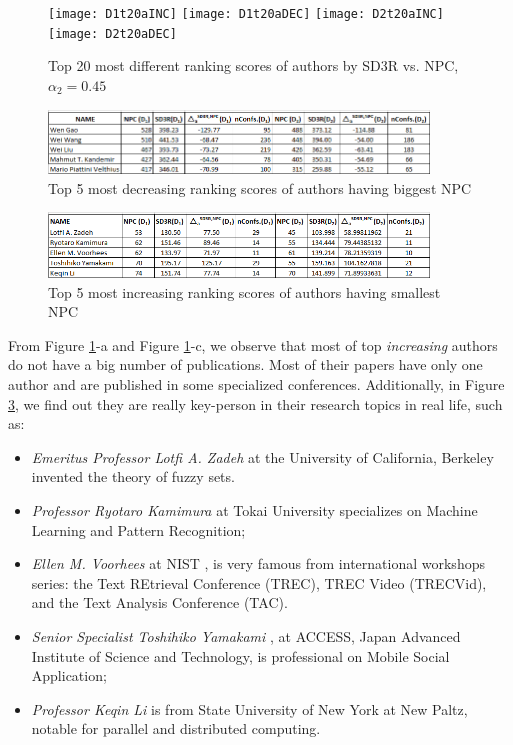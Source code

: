 \documentclass[10pt,leqno,twoside]{article}
\begin{document}
\begin{figure} 
	\caption{Top 20 most different ranking scores of authors by SD3R vs. NPC, $\alpha_2=0.45$}
	\label{Fig:Top20AuthorIncDec}
    \centering
    \texttt{[image: D1t20aINC]}
    \texttt{[image: D1t20aDEC]}
    \texttt{[image: D2t20aINC]}
    \texttt{[image: D2t20aDEC]}
\end{figure}
%
%
\begin{figure} %
	\caption{Top 5 most decreasing ranking scores of authors having biggest NPC}
	\label{Fig:Top5AuthorDec}
    \centering
    \includegraphics[width=0.9\textwidth]{T5adec}
\end{figure}
%
%
\begin{figure} %
	\caption{Top 5 most increasing ranking scores of authors having smallest NPC}
	\label{Fig:Top5AuthorInc}
    \centering
    \includegraphics[width=0.9\textwidth]{T5ainc}
\end{figure}
%
From Figure \ref{Fig:Top20AuthorIncDec}-a and Figure \ref{Fig:Top20AuthorIncDec}-c, we observe that most of top \textit{increasing} authors do not have a big number of publications. Most of their papers have only one author and are published in some specialized conferences. Additionally, in Figure \ref{Fig:Top5AuthorInc}, we find out they are really key-person in their research topics in real life, such as:
\begin{itemize} 
\item \textit{Emeritus Professor  Lotfi A. Zadeh} %
at the University of California, Berkeley invented the theory of fuzzy sets.
\item \textit{Professor Ryotaro Kamimura} at Tokai University %
specializes on Machine Learning and Pattern Recognition; 
\item \textit{Ellen M. Voorhees} at NIST%
, is very famous from international workshops series: the Text REtrieval Conference (TREC), TREC Video (TRECVid), and the Text Analysis Conference (TAC).
\item \textit{Senior Specialist Toshihiko Yamakami}%
, at ACCESS, Japan Advanced Institute of Science and Technology, is professional on Mobile Social Application; 
\item \textit{Professor Keqin Li}
 is from State University of New York at New Paltz, notable for parallel and distributed computing.
\end{itemize}
\end{document}

